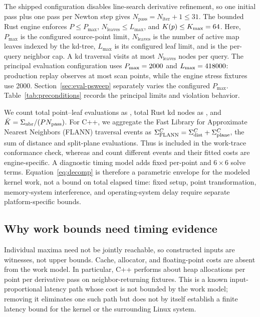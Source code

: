 The shipped configuration disables line-search derivative refinement, so one initial pass
plus one pass per Newton step gives $N_{\mathrm{pass}}=N_{\mathrm{iter}}+1\le31$.
The bounded Rust engine enforces $P\le P_{\max}$,
$N_{\mathrm{leaves}}\le L_{\max}$, and $K(p)\le K_{\max}=64$. Here, $P_{\max}$ is
the configured source-point limit, $N_{\mathrm{leaves}}$ is the number of active map
leaves indexed by the kd-tree, $L_{\max}$ is its configured leaf limit, and \maxnn{} is
the per-query neighbor cap. A kd traversal visits at most $N_{\mathrm{leaves}}$ nodes per
query. The principal evaluation configuration uses $P_{\max}=2000$ and
$L_{\max}=418000$: production replay observes at most \realPMax{} scan points, while
the engine stress fixtures use 2000. Section~\ref{sec:eval-psweep} separately varies the
configured $P_{\max}$. Table~\ref{tab:preconditions} records the principal limits and
violation behavior.

We count total point--leaf evaluations as \sumnbr, total Rust kd nodes as \kdnodes, and
$\bar K=\Sigma_{\mathrm{nbr}}/(P N_{\mathrm{pass}})$. For C++, we aggregate the Fast Library for Approximate Nearest Neighbors (FLANN)
traversal events as
$\Sigma_{\mathrm{FLANN}}^{C}=\Sigma_{\mathrm{dist}}^{C}+\Sigma_{\mathrm{plane}}^{C}$, the sum of
distance and split-plane evaluations. Thus \sumnbr{} is included in the work-trace
conformance check, whereas \kdnodes{} and \flannevals{} count different events and their
fitted costs are engine-specific. A diagnostic timing model adds fixed per-point and
$6{\times}6$ solve terms. Equation~\eqref{eq:decomp} is therefore a parametric envelope for
the modeled kernel work, not a bound on total elapsed time: fixed setup, point
transformation, memory-system interference, and operating-system delay require separate
platform-specific bounds.

\subsection{Why work bounds need timing evidence}
Individual maxima need not be jointly reachable, so constructed inputs are witnesses, not
upper bounds. Cache, allocator, and floating-point costs are absent from the work model.
In particular, C++ performs about \allocPerPtPass{} heap allocations per point per derivative pass on
neighbor-returning fixtures. This is a known input-proportional latency path whose cost is
not bounded by the work model;
removing it eliminates one such path but does not by itself establish a finite latency bound
for the kernel or the surrounding Linux system.
